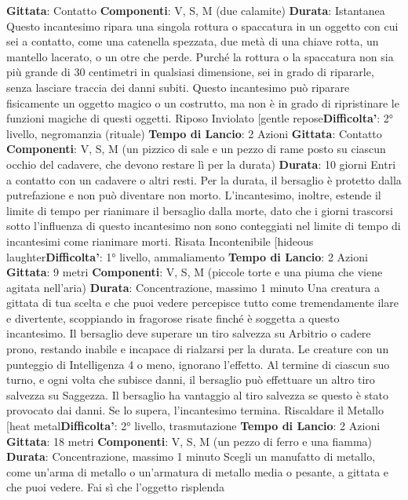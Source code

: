 \begin{multicols}{2}
\textbf{Gittata}: Contatto
\textbf{Componenti}: V, S, M (due calamite)
\textbf{Durata}: Istantanea
Questo incantesimo ripara una singola rottura o
spaccatura in un oggetto con cui sei a contatto, come
una catenella spezzata, due metà di una chiave rotta,
un mantello lacerato, o un otre che perde. Purché la
rottura o la spaccatura non sia più grande di 30
centimetri in qualsiasi dimensione, sei in grado di
ripararle, senza lasciare traccia dei danni subiti.
Questo incantesimo può riparare fisicamente un
oggetto magico o un costrutto, ma non è in grado di
ripristinare le funzioni magiche di questi oggetti.
Riposo Inviolato
[gentle repose\textbf{Difficolta'}:
2° livello, negromanzia (rituale)
\textbf{Tempo di Lancio}: 2 Azioni
\textbf{Gittata}: Contatto
\textbf{Componenti}: V, S, M (un pizzico di sale e un pezzo di
rame posto su ciascun occhio del cadavere, che
devono restare lì per la durata)
\textbf{Durata}: 10 giorni
Entri a contatto con un cadavere o altri resti. Per la
durata, il bersaglio è protetto dalla putrefazione e non
può diventare non morto.
L’incantesimo, inoltre, estende il limite di tempo per
rianimare il bersaglio dalla morte, dato che i giorni
trascorsi sotto l’influenza di questo incantesimo non 
sono conteggiati nel limite di tempo di incantesimi come
rianimare morti.
Risata Incontenibile
[hideous laughter\textbf{Difficolta'}:
1° livello, ammaliamento
\textbf{Tempo di Lancio}: 2 Azioni
\textbf{Gittata}: 9 metri
\textbf{Componenti}: V, S, M (piccole torte e una piuma che
viene agitata nell’aria)
\textbf{Durata}: Concentrazione, massimo 1 minuto
Una creatura a gittata di tua scelta e che puoi vedere
percepisce tutto come tremendamente ilare e
divertente, scoppiando in fragorose risate finché è
soggetta a questo incantesimo. Il bersaglio deve
superare un tiro salvezza su Arbitrio o cadere prono,
restando inabile e incapace di rialzarsi per la durata. Le
creature con un punteggio di Intelligenza 4 o meno,
ignorano l’effetto.
Al termine di ciascun suo turno, e ogni volta che
subisce danni, il bersaglio può effettuare un altro tiro
salvezza su Saggezza. Il bersaglio ha vantaggio al tiro
salvezza se questo è stato provocato dai danni. Se lo
supera, l’incantesimo termina.
Riscaldare il Metallo
[heat metal\textbf{Difficolta'}:
2° livello, trasmutazione
\textbf{Tempo di Lancio}: 2 Azioni
\textbf{Gittata}: 18 metri
\textbf{Componenti}: V, S, M (un pezzo di ferro e una fiamma)
\textbf{Durata}: Concentrazione, massimo 1 minuto
Scegli un manufatto di metallo, come un’arma di
metallo o un’armatura di metallo media o pesante, a
gittata e che puoi vedere. Fai sì che l’oggetto risplenda

\end{multicols}
